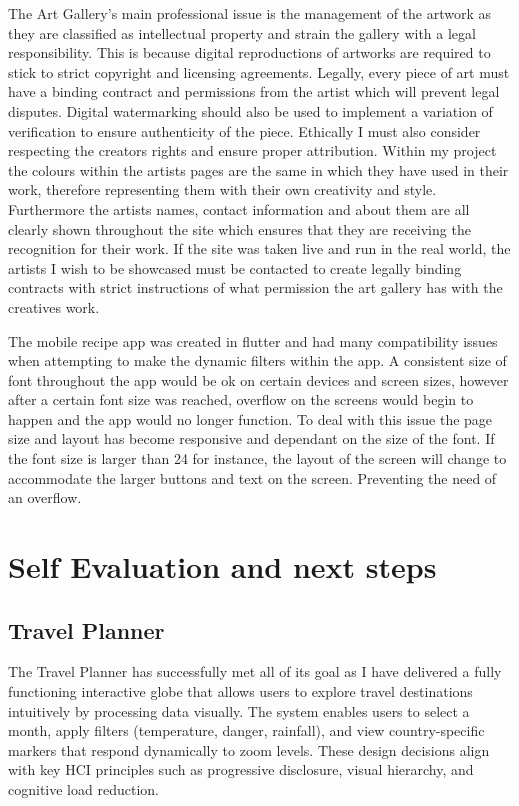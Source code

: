 \documentclass[]{project_final}
\begin{document}
The Art Gallery's main professional issue is the management of the artwork as they are classified as intellectual property and strain the gallery with a legal responsibility. This is because digital reproductions of artworks are required to stick to strict copyright and licensing agreements. Legally, every piece of art must have a binding contract and permissions from the artist which will prevent legal disputes. Digital watermarking should also be used to implement a variation of verification to ensure authenticity of the piece.
Ethically I must also consider respecting the creators rights and ensure proper attribution. Within my project the colours within the artists pages are the same in which they have used in their work, therefore representing them with their own creativity and style. Furthermore the artists names, contact information and about them are all clearly shown throughout the site which ensures that they are receiving the recognition for their work. If the site was taken live and run in the real world, the artists I wish to be showcased must be contacted to create legally binding contracts with strict instructions of what permission the art gallery has with the creatives work.


The mobile recipe app was created in flutter and had many compatibility issues when attempting to make the dynamic filters within the app. A consistent size of font throughout the app would be ok on certain devices and screen sizes, however after a certain font size was reached, overflow on the screens would begin to happen and the app would no longer function. To deal with this issue the page size and layout has become responsive and dependant on the size of the font. If the font size is larger than 24 for instance, the layout of the screen will change to accommodate the larger buttons and text on the screen. Preventing the need of an overflow.














\chapter{Self Evaluation and next steps}
\section{Travel Planner}
The Travel Planner has successfully met all of its goal as I have delivered a fully functioning interactive globe that allows users to explore travel destinations intuitively by processing data visually. The system enables users to select a month, apply filters (temperature, danger, rainfall), and view country-specific markers that respond dynamically to zoom levels. These design decisions align with key HCI principles such as progressive disclosure, visual hierarchy, and cognitive load reduction.
\end{document}

